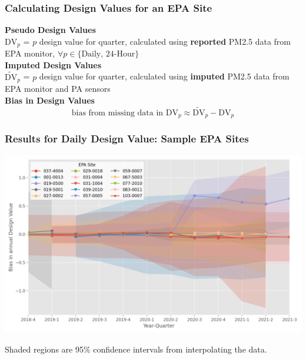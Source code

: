 \documentclass{beamer}
\begin{document}
\begin{frame}
\frametitle{Calculating Design Values for an EPA Site}

\def\dvp{\text{DV}_p}
\def\dvpp{\widetilde{\text{DV}}_p}

\textbf{Pseudo Design Values}\\[0.5em]
$\dvp$ = $p$ design value for quarter, calculated using \textbf{reported} PM2.5 data from EPA monitor, $\forall p \in \{\text{Daily, 24-Hour}\}$
\\[1em]

\textbf{Imputed Design Values}\\[0.5em]
$\dvpp$ = $p$ design value for quarter, calculated using \textbf{imputed} PM2.5 data from EPA monitor and PA sensors
\\[2em]
\textbf{Bias in Design Values}
\begin{equation*}
    \text{bias from missing data in }\dvp \approx \dvpp - \dvp
\end{equation*}

\end{frame}


\begin{frame}
\frametitle{Results for Daily Design Value: Sample EPA Sites}
\includegraphics[width=\textwidth]{output/figures/final_results/DV_annual_plot_all_test_sites.png}

{\small Shaded regions are 95\% confidence intervals from interpolating the data.}
\end{frame}
\end{document}
